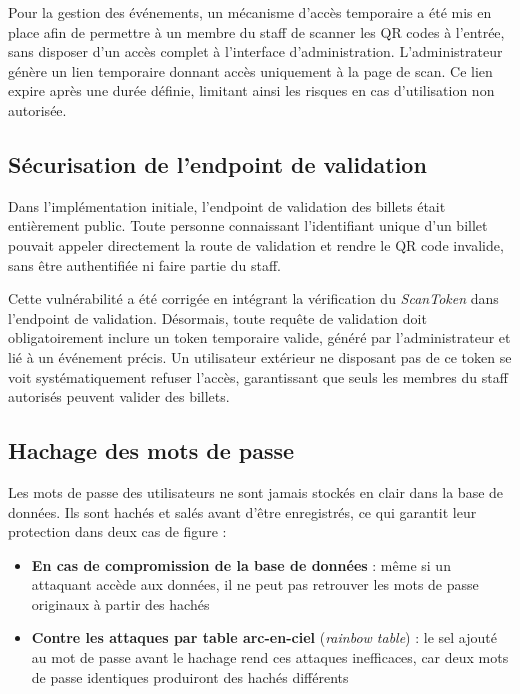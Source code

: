 \documentclass{article}
\begin{document}
Pour la gestion des événements, un mécanisme d'accès temporaire a 
été mis en place afin de permettre à un membre du staff de scanner 
les QR codes à l'entrée, sans disposer d'un accès complet à 
l'interface d'administration. L'administrateur génère un lien 
temporaire donnant accès uniquement à la page de scan. Ce lien 
expire après une durée définie, limitant ainsi les risques en cas 
d'utilisation non autorisée.

\subsection{Sécurisation de l'endpoint de validation}

Dans l'implémentation initiale, l'endpoint de validation des 
billets était entièrement public. Toute personne connaissant 
l'identifiant unique d'un billet pouvait appeler directement 
la route de validation et rendre le QR code invalide, sans 
être authentifiée ni faire partie du staff.

Cette vulnérabilité a été corrigée en intégrant la vérification 
du \textit{ScanToken} dans l'endpoint de validation. Désormais, 
toute requête de validation doit obligatoirement inclure un 
token temporaire valide, généré par l'administrateur et lié à 
un événement précis. Un utilisateur extérieur ne disposant pas 
de ce token se voit systématiquement refuser l'accès, garantissant 
que seuls les membres du staff autorisés peuvent valider des billets.

\subsection{Hachage des mots de passe}

Les mots de passe des utilisateurs ne sont jamais stockés en clair 
dans la base de données. Ils sont hachés et salés avant d'être 
enregistrés, ce qui garantit leur protection dans deux cas de figure :

\begin{itemize}
    \item \textbf{En cas de compromission de la base de données} : 
    même si un attaquant accède aux données, il ne peut pas 
    retrouver les mots de passe originaux à partir des hachés
    \item \textbf{Contre les attaques par table arc-en-ciel} 
    (\textit{rainbow table}) : le sel ajouté au mot de passe avant 
    le hachage rend ces attaques inefficaces, car deux mots de passe 
    identiques produiront des hachés différents
\end{itemize}
\end{document}
